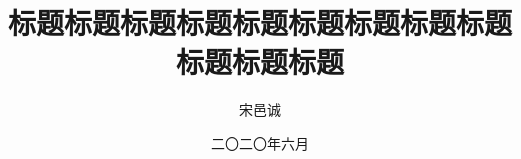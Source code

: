 \documentclass[a4paper, 12pt]{config/HBUThesis}
\date{二〇二〇年六月}
\title{标题标题标题标题标题标题标题标题标题标题标题标题}
\author{宋邑诚}
\begin{document}
\makecover



\tableofcontents
\end{document}
